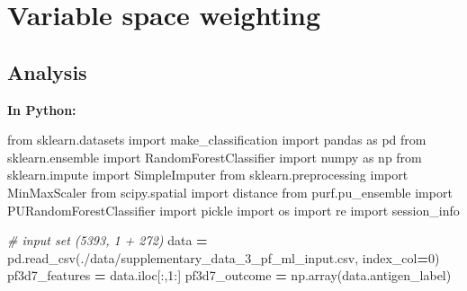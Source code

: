 \documentclass[
  11pt,
  oneside]{book}
\newenvironment{Shaded}{\begin{snugshade}}{\end{snugshade}}
\newcommand{\CommentTok}[1]{\textcolor[rgb]{0.56,0.35,0.01}{\textit{#1}}}
\newcommand{\DecValTok}[1]{\textcolor[rgb]{0.00,0.00,0.81}{#1}}
\newcommand{\ImportTok}[1]{#1}
\newcommand{\NormalTok}[1]{#1}
\newcommand{\OperatorTok}[1]{\textcolor[rgb]{0.81,0.36,0.00}{\textbf{#1}}}
\newcommand{\StringTok}[1]{\textcolor[rgb]{0.31,0.60,0.02}{#1}}
\begin{document}
\hypertarget{variable-space-weighting}{%
\section{Variable space weighting}\label{variable-space-weighting}}

\hypertarget{analysis-2}{%
\subsection{Analysis}\label{analysis-2}}

\textbf{In Python: }

\begin{Shaded}
\begin{Highlighting}[]
\ImportTok{from}\NormalTok{ sklearn.datasets }\ImportTok{import}\NormalTok{ make\_classification}
\ImportTok{import}\NormalTok{ pandas }\ImportTok{as}\NormalTok{ pd}
\ImportTok{from}\NormalTok{ sklearn.ensemble }\ImportTok{import}\NormalTok{ RandomForestClassifier}
\ImportTok{import}\NormalTok{ numpy }\ImportTok{as}\NormalTok{ np}
\ImportTok{from}\NormalTok{ sklearn.impute }\ImportTok{import}\NormalTok{ SimpleImputer}
\ImportTok{from}\NormalTok{ sklearn.preprocessing }\ImportTok{import}\NormalTok{ MinMaxScaler}
\ImportTok{from}\NormalTok{ scipy.spatial }\ImportTok{import}\NormalTok{ distance}
\ImportTok{from}\NormalTok{ purf.pu\_ensemble }\ImportTok{import}\NormalTok{ PURandomForestClassifier}
\ImportTok{import}\NormalTok{ pickle}
\ImportTok{import}\NormalTok{ os}
\ImportTok{import}\NormalTok{ re}
\ImportTok{import}\NormalTok{ session\_info}
\end{Highlighting}
\end{Shaded}

\begin{Shaded}
\begin{Highlighting}[]
\CommentTok{\# input set (5393, 1 + 272)}
\NormalTok{data }\OperatorTok{=}\NormalTok{ pd.read\_csv(}\StringTok{\textquotesingle{}./data/supplementary\_data\_3\_pf\_ml\_input.csv\textquotesingle{}}\NormalTok{, index\_col}\OperatorTok{=}\DecValTok{0}\NormalTok{)}
\NormalTok{pf3d7\_features }\OperatorTok{=}\NormalTok{ data.iloc[:,}\DecValTok{1}\NormalTok{:]}
\NormalTok{pf3d7\_outcome }\OperatorTok{=}\NormalTok{ np.array(data.antigen\_label)}
\end{Highlighting}
\end{Shaded}
\end{document}
